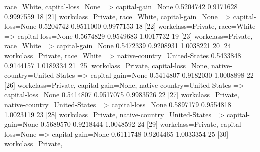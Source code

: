 \documentclass [a4paper] {article}
\begin{document}
{\begin{Schunk}
\begin{Soutput}
{      race=White,                                                                                           
      capital-loss=None}            => {capital-gain=None}            0.5204742  0.9171628 0.9997559      18
[21] {workclass=Private,                                                                                    
      race=White,                                                                                           
      capital-gain=None}            => {capital-loss=None}            0.5204742  0.9511000 0.9977153      18
[22] {workclass=Private,                                                                                    
      race=White}                   => {capital-loss=None}            0.5674829  0.9549683 1.0017732      19
[23] {workclass=Private,                                                                                    
      race=White}                   => {capital-gain=None}            0.5472339  0.9208931 1.0038221      20
[24] {workclass=Private,                                                                                    
      race=White}                   => {native-country=United-States} 0.5433848  0.9144157 1.0189334      21
[25] {workclass=Private,                                                                                    
      capital-loss=None,                                                                                    
      native-country=United-States} => {capital-gain=None}            0.5414807  0.9182030 1.0008898      22
[26] {workclass=Private,                                                                                    
      capital-gain=None,                                                                                    
      native-country=United-States} => {capital-loss=None}            0.5414807  0.9517075 0.9983526      22
[27] {workclass=Private,                                                                                    
      native-country=United-States} => {capital-loss=None}            0.5897179  0.9554818 1.0023119      23
[28] {workclass=Private,                                                                                    
      native-country=United-States} => {capital-gain=None}            0.5689570  0.9218444 1.0048592      24
[29] {workclass=Private,                                                                                    
      capital-loss=None}            => {capital-gain=None}            0.6111748  0.9204465 1.0033354      25
[30] {workclass=Private,                                                                                    
}
\end{Soutput}
\end{Schunk}}
\end{document}
